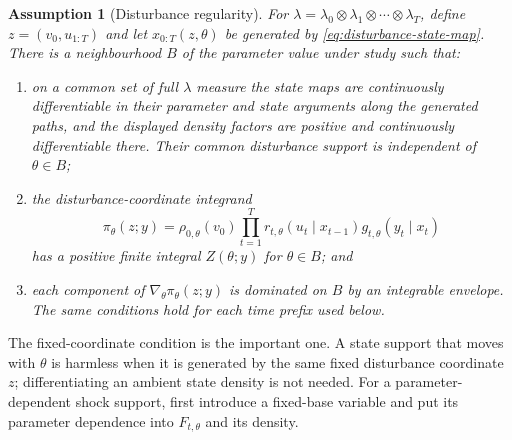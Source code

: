 \documentclass[11pt]{article}
\newtheorem{assumption}{Assumption}
\begin{document}
\begin{assumption}[Disturbance regularity]
\label{ass:disturbance-regularity}
For $\lambda=\lambda_0\otimes\lambda_1\otimes\cdots\otimes\lambda_T$,
define $z=(v_0,u_{1:T})$ and let $x_{0:T}(z,\theta)$ be generated by
\eqref{eq:disturbance-state-map}. There is a neighbourhood $B$ of the
parameter value under study such that:
\begin{enumerate}[label=(\roman*)]
  \item on a common set of full $\lambda$ measure the state maps are
        continuously differentiable in their parameter and state arguments
        along the generated paths, and the displayed density factors are
        positive and continuously differentiable there. Their common
        disturbance support is independent of $\theta\in B$;
  \item the disturbance-coordinate integrand
        \begin{equation}
        \pi_\theta(z;y)=\rho_{0,\theta}(v_0)
        \prod_{t=1}^T r_{t,\theta}(u_t\mid x_{t-1})
        g_{t,\theta}(y_t\mid x_t)
        \label{eq:disturbance-joint-integrand}
        \end{equation}
        has a positive finite integral $Z(\theta;y)$ for $\theta\in B$; and
  \item each component of $\nabla_\theta\pi_\theta(z;y)$ is dominated on $B$ by an
        integrable envelope. The same conditions hold for each time prefix
        used below.
\end{enumerate}
\end{assumption}

The fixed-coordinate condition is the important one. A state support that
moves with $\theta$ is harmless when it is generated by the same fixed
disturbance coordinate $z$; differentiating an ambient state density is not
needed. For a parameter-dependent shock support, first introduce a fixed-base
variable and put its parameter dependence into $F_{t,\theta}$ and its density.
\end{document}
